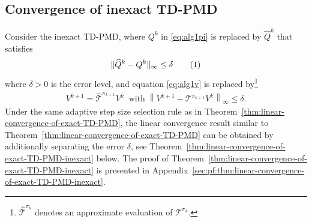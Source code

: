 \documentclass[10pt]{article}
\newcommand{\calT}{\mathcal{T}}
\newcommand{\ls}{\left}
\newcommand{\rs}{\right}
\newcommand\numberthis{\addtocounter{equation}{1}\tag{\theequation}}
\theoremstyle{plain}
\newtheorem{lemma}[theorem]{Lemma}
\theoremstyle{definition}
\begin{document}
\subsection{Convergence of inexact TD-PMD}
Consider the inexact TD-PMD, where $Q^k$ in \eqref{eq:alg1pi} is replaced by $\widehat{Q}^k$ that satisfies 
\begin{align*}\| \widehat{Q}^k-Q^k \| _{\infty}\le \delta \numberthis\label{Q esitmation error}
\end{align*}
where $\delta>0$ is the error level, and equation \eqref{eq:alg1v} is replaced by\footnote{$\widehat{\mathcal{T}}^{\pi_k}$ denotes an approximate evaluation of ${\mathcal{T}}^{\pi_k}$.}
\begin{align}
    V^{k+1}=\widehat{\mathcal{T}}^{\pi_{k+1}} V^k \;\; \mbox{with} \; \left\| V^{k+1}-\mathcal{T} ^{\pi _{k+1}}V^k \right\| _{\infty}\le \delta.\label{V esitmation error}
\end{align}
Under the same adaptive step size selection rule as in Theorem~\ref{thm:linear-convergence-of-exact-TD-PMD}, the linear convergence result similar to Theorem~\ref{thm:linear-convergence-of-exact-TD-PMD} can be obtained by additionally separating the error $\delta$, see Theorem~\ref{thm:linear-convergence-of-exact-TD-PMD-inexact} below. The proof of Theorem~\ref{thm:linear-convergence-of-exact-TD-PMD-inexact} is presented in Appendix~\ref{sec:pf:thm:linear-convergence-of-exact-TD-PMD-inexact}.


\end{document}
